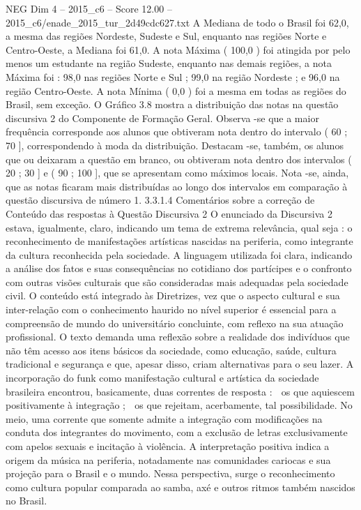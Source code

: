 \begin{textsample}{NEG Dim 4 – 2015\_c6 – Score 12.00 – 2015\_c6/enade\_2015\_tur\_2d49cdc627.txt}
A Mediana de todo o Brasil foi 62,0, a mesma das regiões Nordeste, Sudeste e Sul, enquanto nas regiões Norte e Centro-Oeste, a Mediana foi 61,0.
A nota Máxima ( 100,0 ) foi atingida por pelo menos um estudante na região Sudeste, enquanto nas demais regiões, a nota Máxima foi : 98,0 nas regiões Norte e Sul ; 99,0 na região Nordeste ; e 96,0 na região Centro-Oeste.
A nota Mínima ( 0,0 ) foi a mesma em todas as regiões do Brasil, sem exceção.
O Gráfico 3.8 mostra a distribuição das notas na questão discursiva 2 do Componente de Formação Geral.
Observa -se que a maior frequência corresponde aos alunos que obtiveram nota dentro do intervalo ( 60 ; 70 ], correspondendo à moda da distribuição.
Destacam -se, também, os alunos que ou deixaram a questão em branco, ou obtiveram nota dentro dos intervalos ( 20 ; 30 ] e ( 90 ; 100 ], que se apresentam como máximos locais.
Nota -se, ainda, que as notas ficaram mais distribuídas ao longo dos intervalos em comparação à questão discursiva de número 1. 3.3.1.4 Comentários sobre a correção de Conteúdo das respostas à Questão Discursiva 2 O enunciado da Discursiva 2 estava, igualmente, claro, indicando um tema de extrema relevância, qual seja : o reconhecimento de manifestações artísticas nascidas na periferia, como integrante da cultura reconhecida pela sociedade.
A linguagem utilizada foi clara, indicando a análise dos fatos e suas consequências no cotidiano dos partícipes e o confronto com outras visões culturais que são consideradas mais adequadas pela sociedade civil.
O conteúdo está integrado às Diretrizes, vez que o aspecto cultural e sua inter-relação com o conhecimento haurido no nível superior é essencial para a compreensão de mundo do universitário concluinte, com reflexo na sua atuação profissional.
O texto demanda uma reflexão sobre a realidade dos indivíduos que não têm acesso aos itens básicos da sociedade, como educação, saúde, cultura tradicional e segurança e que, apesar disso, criam alternativas para o seu lazer.
A incorporação do funk como manifestação cultural e artística da sociedade brasileira encontrou, basicamente, duas correntes de resposta :  os que aquiescem positivamente à integração ;  os que rejeitam, acerbamente, tal possibilidade.
No meio, uma corrente que somente admite a integração com modificações na conduta dos integrantes do movimento, com a exclusão de letras exclusivamente com apelos sexuais e incitação à violência.
A interpretação positiva indica a origem da música na periferia, notadamente nas comunidades cariocas e sua projeção para o Brasil e o mundo.
Nessa perspectiva, surge o reconhecimento como cultura popular comparada ao samba, axé e outros ritmos também nascidos no Brasil.

\end{textsample}
